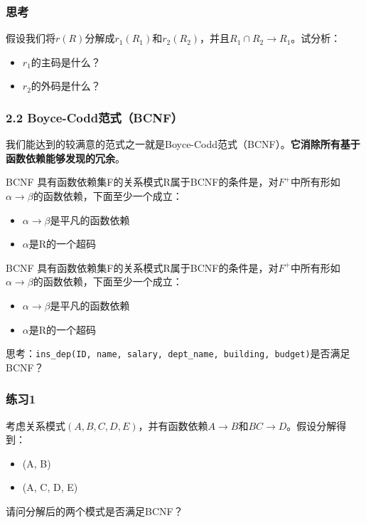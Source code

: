\documentclass[aspectratio=169, 14pt]{beamer}
\begin{document}
\begin{frame}
    \frametitle{思考}
假设我们将$r(R)$分解成$r_1(R_1)$和$r_2(R_2)$，并且$R_1 \cap R_2 \rightarrow R_1$。试分析：

\begin{itemize}
    \item $r_1$的主码是什么？
    \item $r_2$的外码是什么？
\end{itemize}
    

\end{frame}

\begin{frame}
    \frametitle{2.2 Boyce-Codd范式（BCNF）}
我们能达到的较满意的范式之一就是\alert{Boyce-Codd范式}（BCNF）。\textbf{它消除所有基于函数依赖能够发现的冗余}。


\begin{exampleblock}{BCNF}
具有函数依赖集F的关系模式R属于BCNF的条件是，对$F^+$中所有形如$\alpha \rightarrow \beta$的函数依赖，下面至少一个成立：
\begin{itemize}
    \item $\alpha \rightarrow \beta$是平凡的函数依赖
    \item $\alpha$是R的一个超码
\end{itemize}
    
\end{exampleblock}

\end{frame}

\begin{frame}

    \begin{exampleblock}{BCNF}
        具有函数依赖集F的关系模式R属于BCNF的条件是，对$F^+$中所有形如$\alpha \rightarrow \beta$的函数依赖，下面至少一个成立：
        \begin{itemize}
            \item $\alpha \rightarrow \beta$是平凡的函数依赖
            \item $\alpha$是R的一个超码
        \end{itemize}
            
        \end{exampleblock}
        
          思考：\texttt{ins\_dep(ID, name, salary, dept\_name, building, budget)}是否满足BCNF？

\end{frame}

\begin{frame}
    \frametitle{练习1}
考虑关系模式$(A, B, C, D, E)$，并有函数依赖$A \rightarrow B$和$BC \rightarrow D$。假设分解得到：

\begin{itemize}
    \item (A, B)
    \item (A, C, D, E)
\end{itemize}

请问分解后的两个模式是否满足BCNF？
    

\end{frame}
\end{document}
